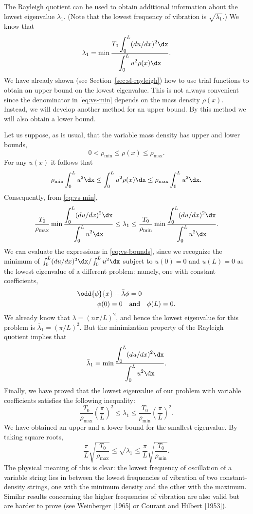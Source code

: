 The Rayleigh quotient can be used to obtain additional information about the lowest eigenvalue $\lambda_1$.  (Note that the lowest frequency of vibration is $\sqrt{\lambda_1}$.)  We know that
\begin{equation}
\label{eq:vs-min}
\lambda_1 = \min\frac{\displaystyle T_0\int_0^L (du/dx)^2\dx}{\displaystyle\int_0^L u^2\rho(x)\dx}.
\end{equation}
We have already shown (see Section~\ref{sec:sl-rayleigh}) how to use trial functions to obtain an upper bound on the lowest eigenvalue.  This is not always convenient since the denominator in \eqref{eq:vs-min} depends on the mass density $\rho(x)$.  Instead, we will develop another method for an upper bound.  By this method we will also obtain a lower bound.

Let us suppose, as is usual, that the variable mass density has upper and lower bounds,
\[
0 < \rho_{\min} \le \rho(x) \le \rho_{\max}.
\]
For any $u(x)$ it follows that
\[
\rho_{\min}\int_0^L u^2\dx \le \int_0^L u^2\rho(x)\dx \le \rho_{\max}\int_0^L u^2\dx.
\]
Consequently, from \eqref{eq:vs-min},
\begin{equation}
\label{eq:vs-bounds}
\frac{T_0}{\rho_{\max}}\min\frac{\displaystyle\int_0^L (du/dx)^2\dx}{\displaystyle\int_0^L u^2\dx} \le \lambda_1 \le \frac{T_0}{\rho_{\min}}\min\frac{\displaystyle\int_0^L (du/dx)^2\dx}{\displaystyle\int_0^L u^2\dx}.
\end{equation}
We can evaluate the expressions in \eqref{eq:vs-bounds}, since we recognize the minimum of $\int_0^L (du/dx)^2\dx / \int_0^L u^2\dx$ subject to $u(0) = 0$ and $u(L) = 0$ as the lowest eigenvalue of a different problem: namely, one with constant coefficients,
\begin{align*}
\odd{\phi}{x} + \bar{\lambda}\phi &= 0 \\
\phi(0) = 0 \quad &\text{and} \quad \phi(L) = 0.
\end{align*}
We already know that $\bar{\lambda} = (n\pi/L)^2$, and hence the lowest eigenvalue for this problem is $\bar{\lambda}_1 = (\pi/L)^2$.  But the minimization property of the Rayleigh quotient implies that
\[
\bar{\lambda}_1 = \min\frac{\displaystyle\int_0^L (du/dx)^2\dx}{\displaystyle\int_0^L u^2\dx}.
\]
Finally, we have proved that the lowest eigenvalue of our problem with variable coefficients satisfies the following inequality:
\[
\frac{T_0}{\rho_{\max}}\left(\frac{\pi}{L}\right)^2 \le \lambda_1 \le \frac{T_0}{\rho_{\min}}\left(\frac{\pi}{L}\right)^2.
\]
We have obtained an upper and a lower bound for the smallest eigenvalue.  By taking square roots,
\[
\frac{\pi}{L}\sqrt{\frac{T_0}{\rho_{\max}}} \le \sqrt{\lambda_1} \le \frac{\pi}{L}\sqrt{\frac{T_0}{\rho_{\min}}}.
\]
The physical meaning of this is clear: the lowest frequency of oscillation of a variable string lies in between the lowest frequencies of vibration of two constant-density strings, one with the minimum density and the other with the maximum.  Similar results concerning the higher frequencies of vibration are also valid but are harder to prove (see Weinberger [1965] or Courant and Hilbert [1953]).

